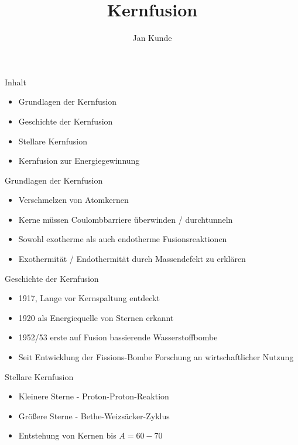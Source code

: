 \documentclass[aspectratio=169,xcolor=dvipsnames,14pt]{beamer}
\title{Kernfusion}
\author{\color{LightGrey}Jan Kunde}
\date{}
\begin{document}
\color{LightGrey}
\begin{frame}{}
\color{LightGrey}
\maketitle
\end{frame}


{
\begin{frame}{Inhalt}
\begin{itemize}
    \color{LightGrey}
\item Grundlagen der Kernfusion
\item Geschichte der Kernfusion
\item Stellare Kernfusion
\item Kernfusion zur Energiegewinnung
\end{itemize}
\end{frame}
}

{
\begin{frame}{Grundlagen der Kernfusion}
\begin{itemize}
    \color{LightGrey}
\item Verschmelzen von Atomkernen
\item Kerne müssen Coulombbarriere überwinden / durchtunneln   
\item Sowohl exotherme als auch endotherme Fusionsreaktionen
\item Exothermität / Endothermität durch Massendefekt zu erklären
\end{itemize}
\end{frame}
}

{
\begin{frame}{Geschichte der Kernfusion}
\begin{itemize}
    \color{LightGrey}
\item 1917, Lange vor Kernspaltung entdeckt
\item 1920 als Energiequelle von Sternen erkannt
\item 1952/53 erste auf Fusion bassierende Wasserstoffbombe
\item Seit Entwicklung der Fissions-Bombe Forschung an wirtschaftlicher Nutzung
\end{itemize}
\end{frame}
}

{
\begin{frame}{Stellare Kernfusion}
    \begin{itemize}
        \color{LightGrey}
        \item Kleinere Sterne - Proton-Proton-Reaktion
        \item Größere Sterne - Bethe-Weizsäcker-Zyklus
        \item Entstehung von Kernen bis $A = 60-70$
    \end{itemize}
\end{frame}
}
\end{document}
